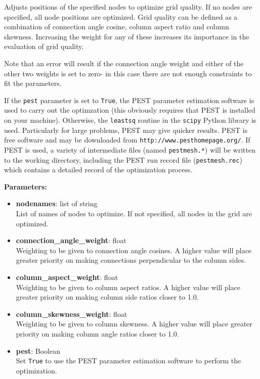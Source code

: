 Adjusts positions of the specified nodes to optimize grid quality.  If no nodes are specified, all node positions are optimized.  Grid quality can be defined as a combination of connection angle cosine, column aspect ratio and column skewness.  Increasing the weight for any of these increases its importance in the evaluation of grid quality.

Note that an error will result if the connection angle weight and either of the other two weights is set to zero- in this case there are not enough constraints to fit the parameters.

If the \texttt{pest} parameter is set to \texttt{True}, the PEST parameter estimation software is used to carry out the optimzation (this obviously requires that PEST is installed on your machine).  Otherwise, the \texttt{leastsq} routine in the \texttt{scipy} Python library is used.  Particularly for large problems, PEST may give quicker results.  PEST is free software and may be downloaded from \texttt{http://www.pesthomepage.org/}.  If PEST is used, a variety of intermediate files (named \texttt{pestmesh.*}) will be written to the working directory, including the PEST run record file (\texttt{pestmesh.rec}) which contains a detailed record of the optimization process.

\textbf{Parameters:}
\begin{itemize}
\item \textbf{nodenames}: list of string\\
  List of names of nodes to optimize.  If not specified, all nodes in the grid are optimized.
\item \textbf{connection\_angle\_weight}: float\\
  Weighting to be given to connection angle cosines.  A higher value will place greater priority on making connections perpendicular to the column sides.
\item \textbf{column\_aspect\_weight}: float\\
  Weighting to be given to column aspect ratios.  A higher value will place greater priority on making column side ratios closer to 1.0.
\item \textbf{column\_skewness\_weight}: float\\
  Weighting to be given to column skewness.  A higher value will place greater priority on making column angle ratios closer to 1.0.
\item \textbf{pest}: Boolean\\
  Set \texttt{True} to use the PEST parameter estimation software to perform the optimization.
\end{itemize}

